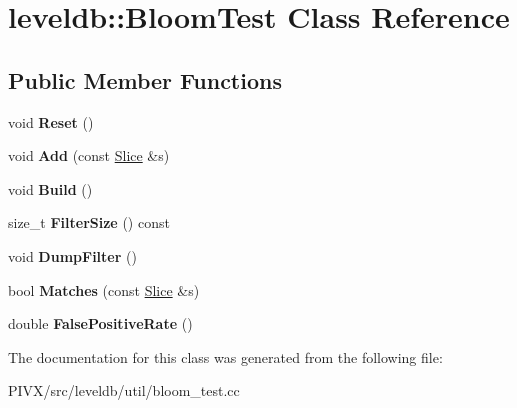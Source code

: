 \hypertarget{classleveldb_1_1_bloom_test}{}\section{leveldb\+:\+:Bloom\+Test Class Reference}
\label{classleveldb_1_1_bloom_test}
\subsection*{Public Member Functions}
\begin{DoxyCompactItemize}
\item 
\mbox{\label{classleveldb_1_1_bloom_test_a067ba6753890a5a924edd7efaad7187a}} 
void {\bfseries Reset} ()
\item 
\mbox{\label{classleveldb_1_1_bloom_test_a2f7777014cec7c35f85373e2832bfd88}} 
void {\bfseries Add} (const \mbox{\hyperlink{classleveldb_1_1_slice}{Slice}} \&s)
\item 
\mbox{\label{classleveldb_1_1_bloom_test_ad4fc802152c68599c919d33917523d31}} 
void {\bfseries Build} ()
\item 
\mbox{\label{classleveldb_1_1_bloom_test_a10dfa3fd52a26dcc5045320d44e55ee4}} 
size\+\_\+t {\bfseries Filter\+Size} () const
\item 
\mbox{\label{classleveldb_1_1_bloom_test_a6f210bc2f2e69c0aeb570fa4dbe4d0da}} 
void {\bfseries Dump\+Filter} ()
\item 
\mbox{\label{classleveldb_1_1_bloom_test_a1d2a9794bd26ac0124a18511689ef211}} 
bool {\bfseries Matches} (const \mbox{\hyperlink{classleveldb_1_1_slice}{Slice}} \&s)
\item 
\mbox{\label{classleveldb_1_1_bloom_test_abf887498db753825b308933df22c0bbb}} 
double {\bfseries False\+Positive\+Rate} ()
\end{DoxyCompactItemize}


The documentation for this class was generated from the following file\+:\begin{DoxyCompactItemize}
\item 
P\+I\+V\+X/src/leveldb/util/bloom\+\_\+test.\+cc\end{DoxyCompactItemize}
